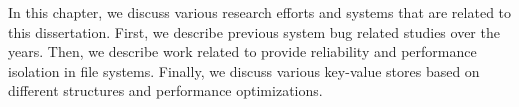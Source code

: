 
In this chapter, we discuss various research efforts and systems that
are related to this dissertation. First, we describe previous system
bug related studies over the years. Then, we describe work related to
provide reliability and performance isolation in file
systems. Finally, we discuss various key-value stores based on
different structures and performance optimizations. 








